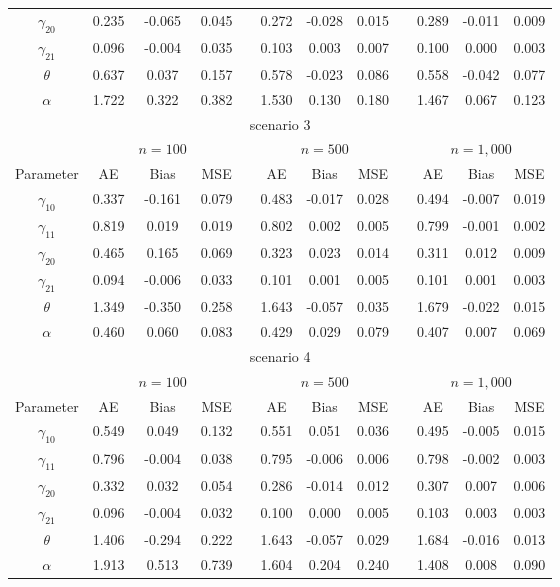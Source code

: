 \documentclass[12pt]{article}
\begin{document}
\begin{table}[htb!]
{\begin{tabular}{cccccccccccc}
$\gamma_{20}$ &0.235   &-0.065 &0.045& &0.272  &-0.028 &0.015&  &0.289  &-0.011 &0.009\\
$\gamma_{21}$ &0.096   &-0.004 &0.035& &0.103  &0.003  &0.007&  &0.100  &0.000  &0.003\\
				
$\theta$      &0.637   &0.037  &0.157& &0.578  &-0.023 &0.086&  &0.558  &-0.042 &0.077\\
$\alpha$      &1.722   &0.322  &0.382& &1.530  &0.130  &0.180&  &1.467  &0.067  &0.123\\
\hline
\multicolumn{ 12}{c}{scenario 3} \\
\hline &  & \multicolumn{1}{c}{$n=100$} &       &
& \multicolumn{3}{c}{$n=500$}  &  &\multicolumn{3}{c}{$n=1,000$}
\\ \cline{2-4} \cline{6-8} \cline{10-12}
Parameter & AE &  Bias  & MSE   &    & AE    &  Bias   & MSE &       & AE & Bias    & MSE \\
\hline
$\gamma_{10}$ &0.337   &-0.161 &0.079& &0.483  &-0.017 &0.028& &0.494 &-0.007 &0.019\\
$\gamma_{11}$ &0.819   &0.019  &0.019& &0.802  &0.002  &0.005& &0.799 &-0.001 &0.002\\
				
$\gamma_{20}$ &0.465   &0.165  &0.069& &0.323  &0.023  &0.014&  &0.311 &0.012  &0.009\\
$\gamma_{21}$ &0.094   &-0.006 &0.033& &0.101  &0.001  &0.005&  &0.101 &0.001  &0.003\\
				
$\theta$      &1.349   &-0.350 &0.258& &1.643  &-0.057 &0.035& &1.679  &-0.022 &0.015\\
$\alpha$      &0.460   &0.060  &0.083& &0.429  &0.029  &0.079& &0.407  &0.007  &0.069\\
\hline
\multicolumn{ 12}{c}{scenario 4} \\
\hline &  & \multicolumn{1}{c}{$n=100$} &       &
& \multicolumn{3}{c}{$n=500$}  &  &\multicolumn{3}{c}{$n=1,000$}
\\ \cline{2-4} \cline{6-8} \cline{10-12}
Parameter     &AE &  Bias  & MSE   &    & AE    &  Bias   & MSE &       & AE & Bias    & MSE \\
\hline
$\gamma_{10}$ &0.549   &0.049  &0.132& &0.551   &0.051  &0.036& &0.495   &-0.005  &0.015\\
$\gamma_{11}$ &0.796   &-0.004 &0.038& &0.795   &-0.006 &0.006& &0.798   &-0.002  &0.003\\
				
$\gamma_{20}$ &0.332   &0.032  &0.054& &0.286   &-0.014 &0.012& &0.307   &0.007   &0.006\\
$\gamma_{21}$ &0.096   &-0.004 &0.032& &0.100   &0.000  &0.005& &0.103   &0.003   &0.003\\
				
$\theta$      &1.406   &-0.294 &0.222& &1.643   &-0.057 &0.029& &1.684   &-0.016  &0.013\\
$\alpha$      &1.913   &0.513  &0.739& &1.604   &0.204  &0.240& &1.408   &0.008   &0.090\\
\hline
\end{tabular}}
\end{table}	
\end{document}

